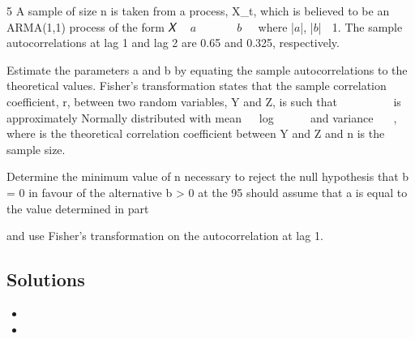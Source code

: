 \documentclass[a4paper,12pt]{article}
\begin{document}


5 A sample of size n is taken from a process, X_{t}, which is believed to be an ARMA(1,1)
process of the form
𝑋􀯧 􀵌 $a$𝑋􀯧􀬿􀬵 􀵅 𝑒􀯧 􀵅 $b$𝑒􀯧􀬿􀬵
where |$a$|, |$b$| 􀵏 1. The sample autocorrelations at lag 1 and lag 2 are 0.65 and 0.325,
respectively.
\item   Estimate the parameters a and b by equating the sample autocorrelations to the
theoretical values. 
Fisher’s transformation states that the sample correlation coefficient, r, between two
random variables, Y and Z, is such that 􀰭
􀰮􀭪􀭭􀭥􁉀􀰭􀰶􀳝
􀰭􀰷􀳝􁉁 is approximately Normally distributed
with mean 􀬵
􀬶 log 􁉀􀬵􀬾􀮡
􀬵􀬿􀮡􁉁 and variance 􀬵
􀯡􀬿􀬷, where \rho  is the theoretical correlation
coefficient between Y and Z and n is the sample size.
\item   Determine the minimum value of n necessary to reject the null hypothesis that
b = 0 in favour of the alternative b > 0 at the 95%
should assume that a is equal to the value determined in part \item   and use
Fisher’s transformation on the autocorrelation at lag 1. 

\subsection*{Solutions}

\begin{itemize}
\item
\item
\end{itemize}
\end{document}
